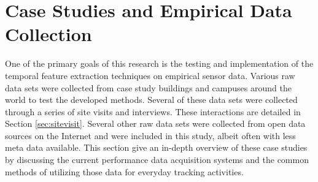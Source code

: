 \section{Case Studies and Empirical Data Collection}
\label{sec:casestudies}

One of the primary goals of this research is the testing and implementation of the temporal feature extraction techniques on empirical sensor data. Various raw data sets were collected from case study buildings and campuses around the world to test the developed methods. Several of these data sets were collected through a series of site visits and interviews. These interactions are detailed in Section \ref{sec:sitevisit}. Several other raw data sets were collected from open data sources on the Internet and were included in this study, albeit often with less meta data available. This section give an in-depth overview of these case studies by discussing the current performance data acquisition systems and the common methods of utilizing those data for everyday tracking activities.